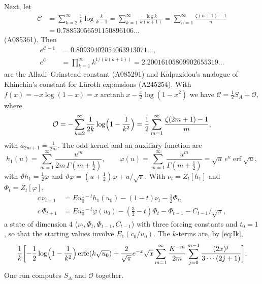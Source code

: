 \documentclass[11pt,reqno]{amsart}
\theoremstyle{definition}
\theoremstyle{remark}
\newcommand{\erfc}{\operatorname{erfc}}
\newcommand{\erf}{\operatorname{erf}}
\newcommand{\arctanh}{\operatorname{arctanh}}
\begin{document}
Next, let
\begin{align*}
  \mathcal C &= \sum_{k=2}^{\infty}\frac1k\log\frac{k}{k-1} = \sum_{k=1}^{\infty}\frac{\log k}{k(k+1)} = \sum_{n=1}^{\infty}\frac{\zeta(n+1)-1}{n} \\
  &= 0.78853056591150896106\ldots
\end{align*}
(A085361). Then
\begin{align*}
  e^{\mathcal C-1} &= 0.80939402054063913071\ldots, \\
  e^{\mathcal C} &= \prod_{k=1}^{\infty}k^{1/(k(k+1))} = 2.20016105809902655319\ldots
\end{align*}
are the Alladi--Grinstead constant \cite{AG77} (A085291) and Kalpazidou's analogue of Khinchin's constant for
L\"uroth expansions \cite{Kal88} (A245254). With
$f(x) = -x\log(1-x) = x\arctanh x - \frac x2\log(1-x^2)$ we have $\mathcal C = \frac12S_A + \mathcal O$, where
\[
  \mathcal O = -\sum_{k=2}^{\infty}\frac{1}{2k}\log\Bigl(1-\frac1{k^2}\Bigr) = \frac12\sum_{m=1}^{\infty}\frac{\zeta(2m+1)-1}{m},
\]
with $a_{2m+1} = \frac1{2m}$. The odd kernel and an auxiliary function are
\[
  h_1(u) = \sum_{m=1}^{\infty}\frac{u^m}{2m\,\Gamma(m+\frac12)}, \qquad
  \varphi(u) = \sum_{m=1}^{\infty}\frac{u^m}{\Gamma(m+\frac12)} = \sqrt u\,e^u\erf\sqrt u,
\]
with $\vartheta h_1 = \frac12\varphi$ and $\vartheta\varphi = (u+\frac12)\varphi + u/\sqrt\pi$. With $\nu_t = Z_t[h_1]$ and
$\Phi_t = Z_t[\varphi]$,
\begin{align*}
  c\,\nu_{t+1} &= Eu_0^{1-t}h_1(u_0) - (1-t)\nu_t - \tfrac12\Phi_t, \\
  c\,\Phi_{t+1} &= Eu_0^{1-t}\varphi(u_0) - (\tfrac32-t)\Phi_t - \Phi_{t-1} - C_{t-1}/\sqrt\pi,
\end{align*}
a state of dimension $4$ ($\nu_t, \Phi_t, \Phi_{t-1}, C_{t-1}$) with three forcing constants and $t_0 = 1$, so that the
starting values involve $E_1(c_0/u_0)$. The $k$-terms are, by \eqref{eq:Ik},
\[
  \frac1k\biggl[-\frac12\log\Bigl(1-\frac1{k^2}\Bigr)\erfc(k\sqrt{u_0})
  + \frac{2}{\sqrt\pi}e^{-x}\sqrt x\sum_{m=1}^{\infty} \frac{K^{-m}}{2m}\sum_{j=0}^{m-1}\frac{(2x)^j}{3\cdots(2j+1)}\biggr].
\]
One run computes $S_A$ and $\mathcal O$ together.
\end{document}
